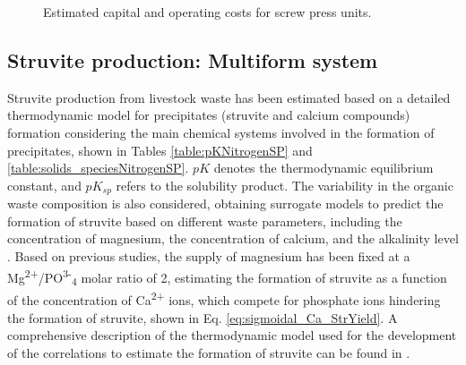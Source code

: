 \begin{refsection}[referencesApD]
\begin{figure}[h!]
	\caption{Estimated capital and operating costs for screw press units.}
	\label{fig:screwpress_costs_AppD}
\end{figure}

\subsection{Struvite production: Multiform system}
Struvite production from livestock waste has been estimated based on a detailed thermodynamic model for precipitates (struvite and calcium compounds) formation considering the main chemical systems involved in the formation of precipitates, shown in Tables \ref{table:pKNitrogenSP} and \ref{table:solids_speciesNitrogenSP}. $pK$ denotes the thermodynamic equilibrium constant, and $pK_{sp}$ refers to the solubility product. The variability in the organic waste composition is also considered, obtaining surrogate models to predict the formation of struvite based on different waste parameters, including the concentration of magnesium, the concentration of calcium, and the alkalinity level \citep{martin2020model}. Based on previous studies, the supply of magnesium has been fixed at a Mg\textsuperscript{2+}/PO\textsuperscript{3-}\textsubscript{4} molar ratio of 2, estimating the formation of struvite as a function of the concentration of Ca\textsuperscript{2+} ions, which compete for phosphate ions hindering the formation of struvite, shown in Eq. \ref{eq:sigmoidal_Ca_StrYield}. A comprehensive description of the thermodynamic model used for the development of the correlations to estimate the formation of struvite can be found in \citet{martin2020model}.


\end{refsection}
